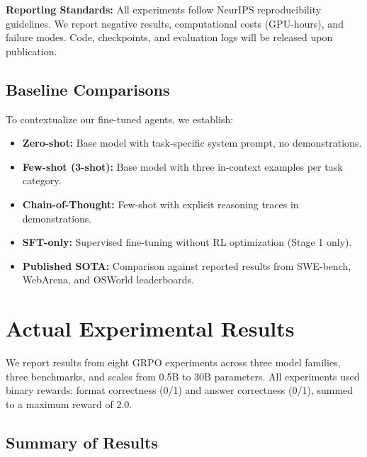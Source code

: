 \documentclass[12pt,a4paper]{report}
\theoremstyle{definition}
\begin{document}
\textbf{Reporting Standards:}
All experiments follow NeurIPS reproducibility guidelines. We report negative results, computational costs (GPU-hours), and failure modes. Code, checkpoints, and evaluation logs will be released upon publication.

\subsection{Baseline Comparisons}
To contextualize our fine-tuned agents, we establish:
\begin{itemize}
    \item \textbf{Zero-shot:} Base model with task-specific system prompt, no demonstrations.
    \item \textbf{Few-shot (3-shot):} Base model with three in-context examples per task category.
    \item \textbf{Chain-of-Thought:} Few-shot with explicit reasoning traces in demonstrations.
    \item \textbf{SFT-only:} Supervised fine-tuning without RL optimization (Stage 1 only).
    \item \textbf{Published SOTA:} Comparison against reported results from SWE-bench, WebArena, and OSWorld leaderboards.
\end{itemize}

\section{Actual Experimental Results}
\label{sec:actual_results}

We report results from eight GRPO experiments across three model families, three benchmarks, and scales from 0.5B to 30B parameters. All experiments used binary rewards: format correctness (0/1) and answer correctness (0/1), summed to a maximum reward of 2.0.

\subsection{Summary of Results}
\end{document}
